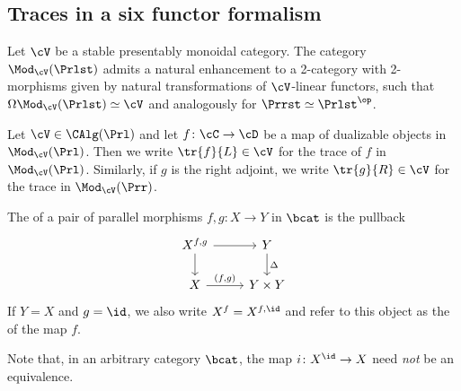 \subsection{Traces in a six functor formalism}

Let $\cV$ be a stable presentably monoidal category. The category
$\Mod_{\cV}(\Prlst)$ admits a natural enhancement to a 2-category with
2-morphisms given by natural transformations of $\cV$-linear functors, such that
$\Omega \Mod_{\cV}(\Prlst)\simeq \cV$ and analogously for $\Prrst \simeq \Prlst^{\op}$.

\begin{defn}
  Let $\cV \in \CAlg(\Prl)$ and let $f\colon \cC\to \cD$ be a map of dualizable objects
  in $\Mod_{\cV}(\Prl)$. Then we write $\tr{f}{L}\in \cV$ for the trace of $f$ in
  $\Mod_{\cV}(\Prl)$. Similarly, if $g$ is the right adjoint, we write
  $\tr{g}{R}\in \cV$ for the trace in $\Mod_{\cV}(\Prr)$.
\end{defn}


\begin{defn}
  The  of a pair of parallel morphisms $f,g\colon X\to Y$ in
  $\bcat$ is the pullback
  \begin{equation}
    \label{eq:coincidence}
    \begin{tikzcd}
      X^{f,g}\arrow[d]\arrow[r] & Y\arrow[d ,"\Delta"] \\
      X\arrow[r,"{(f,g)}"] & Y\times Y
    \end{tikzcd}
  \end{equation}
  If $Y = X$ and $g=\id$, we also write $X^{f} = X^{f,\id}$ and refer to this
  object as the  of the map $f$.
\end{defn}
Note that, in an arbitrary category $\bcat$, the map $i\colon X^{\id} \to X$ need \textit{not}
be an equivalence.

